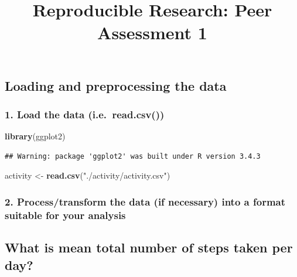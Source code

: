 \documentclass[]{article}
\title{Reproducible Research: Peer Assessment 1}
\author{}
\date{}
\newenvironment{Shaded}{\begin{snugshade}}{\end{snugshade}}
\newcommand{\KeywordTok}[1]{\textcolor[rgb]{0.13,0.29,0.53}{\textbf{#1}}}
\newcommand{\StringTok}[1]{\textcolor[rgb]{0.31,0.60,0.02}{#1}}
\newcommand{\OperatorTok}[1]{\textcolor[rgb]{0.81,0.36,0.00}{\textbf{#1}}}
\newcommand{\NormalTok}[1]{#1}
\begin{document}
\maketitle

\subsection{Loading and preprocessing the
data}\label{loading-and-preprocessing-the-data}

\subsubsection{1. Load the data
(i.e.~read.csv())}\label{load-the-data-i.e.read.csv}

\begin{Shaded}
\begin{Highlighting}[]
\KeywordTok{library}\NormalTok{(ggplot2)}
\end{Highlighting}
\end{Shaded}

\begin{verbatim}
## Warning: package 'ggplot2' was built under R version 3.4.3
\end{verbatim}

\begin{Shaded}
\begin{Highlighting}[]
\NormalTok{activity <-}\StringTok{ }\KeywordTok{read.csv}\NormalTok{(}\StringTok{"./activity/activity.csv"}\NormalTok{)}
\end{Highlighting}
\end{Shaded}

\subsubsection{2. Process/transform the data (if necessary) into a
format suitable for your
analysis}\label{processtransform-the-data-if-necessary-into-a-format-suitable-for-your-analysis}

\begin{Shaded}
\end{Shaded}

\subsection{What is mean total number of steps taken per
day?}\label{what-is-mean-total-number-of-steps-taken-per-day}
\end{document}

